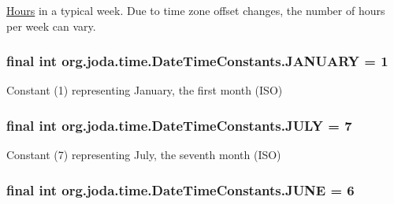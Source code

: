 \hyperlink{classorg_1_1joda_1_1time_1_1_hours}{Hours} in a typical week. Due to time zone offset changes, the number of hours per week can vary. \hypertarget{classorg_1_1joda_1_1time_1_1_date_time_constants_aed09ce4951d640f18368cc4fbd042739}{
\subsubsection[{J\-A\-N\-U\-A\-R\-Y}]{\setlength{\rightskip}{0pt plus 5cm}final int org.\-joda.\-time.\-Date\-Time\-Constants.\-J\-A\-N\-U\-A\-R\-Y = 1\hspace{0.3cm}{\ttfamily [static]}}}\label{classorg_1_1joda_1_1time_1_1_date_time_constants_aed09ce4951d640f18368cc4fbd042739}
Constant (1) representing January, the first month (I\-S\-O) \hypertarget{classorg_1_1joda_1_1time_1_1_date_time_constants_af7b25dfbec63e50659f9870c1e17f2e5}{
\subsubsection[{J\-U\-L\-Y}]{\setlength{\rightskip}{0pt plus 5cm}final int org.\-joda.\-time.\-Date\-Time\-Constants.\-J\-U\-L\-Y = 7\hspace{0.3cm}{\ttfamily [static]}}}\label{classorg_1_1joda_1_1time_1_1_date_time_constants_af7b25dfbec63e50659f9870c1e17f2e5}
Constant (7) representing July, the seventh month (I\-S\-O) \hypertarget{classorg_1_1joda_1_1time_1_1_date_time_constants_a2f0cf58ff3f296af036ae1d51ee459d5}{
\subsubsection[{J\-U\-N\-E}]{\setlength{\rightskip}{0pt plus 5cm}final int org.\-joda.\-time.\-Date\-Time\-Constants.\-J\-U\-N\-E = 6\hspace{0.3cm}{\ttfamily [static]}}}\label{classorg_1_1joda_1_1time_1_1_date_time_constants_a2f0cf58ff3f296af036ae1d51ee459d5}

